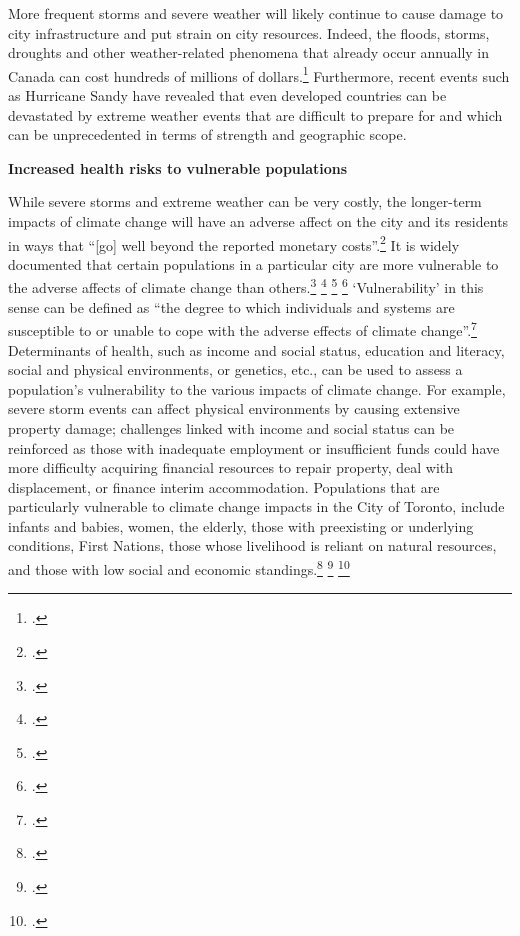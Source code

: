 More frequent storms and severe weather will likely continue to cause damage to city infrastructure and put strain on city resources. 
Indeed, the floods, storms, droughts and other weather-related phenomena that already occur annually in Canada can cost hundreds of millions of dollars.\footcite[][p. 11]{HHInACC}
Furthermore, recent events such as Hurricane Sandy have revealed that even developed countries can be devastated by extreme weather events that are difficult to prepare for and which can be unprecedented in terms of strength and geographic scope.   



\textbf{Increased health risks to vulnerable populations}



While severe storms and extreme weather can be very costly, the longer-term  impacts of climate change will have an adverse affect on the city and its residents in ways that ``[go] well beyond the reported monetary costs''.\footcite[][p. 19]{CCAHealthEquity}
It is widely documented that certain populations in a particular city are more vulnerable to the adverse affects of climate change than others.\footcite[][]{EbiHealthJustice} \footcite[][]{HotWeatherResponse2006} \footcite[][p. 1153--1163]{MarmotHealthOutcomes} \footcite[][]{ReducingHealthDisparities}
`Vulnerability' in this sense can be defined as ``the degree to which individuals and systems are susceptible to or unable to cope with the adverse effects of climate change''.\footcite[][p. 6]{CCAHealthEquity}
Determinants of health, such as income and social status, education and literacy, social and physical environments, or genetics, etc., can be used to assess a population's vulnerability to the various impacts of climate change. 
For example, severe storm events can affect physical environments by causing extensive property damage; challenges linked with income and social status can be reinforced as those with inadequate employment or insufficient funds could have more difficulty acquiring financial resources to repair property, deal with displacement, or finance interim accommodation. 
Populations that are particularly vulnerable to climate change impacts in the City of Toronto, include infants and babies, women, the elderly, those with preexisting or underlying conditions, First Nations, those whose livelihood is reliant on natural resources, and those with low social and economic standings.\footcite{CCAHealthEquity} \footcite[][]{HHInACC} \footcite[][]{HealthCanadaPreparingImpacts}



